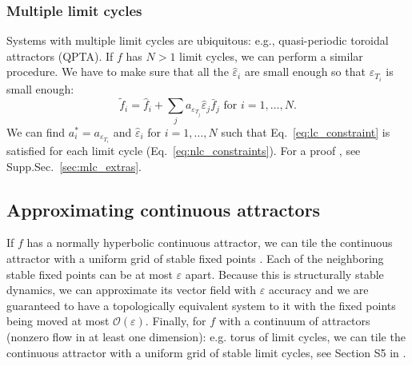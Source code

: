 \documentclass{article}
\theoremstyle{definition} \newtheorem{definition}{Definition}
\theoremstyle{remark} \newtheorem{remark}{Remark}
\newcounter{ct}
\begin{document}
\subsubsection{Multiple limit cycles}
Systems with multiple limit cycles are ubiquitous: e.g., quasi-periodic toroidal attractors (QPTA)\citep{Park2023a}.
%
If $f$ has $N>1$ limit cycles, we can perform a similar procedure.
We have to make sure that all the $\hat{\varepsilon}_i$ are small enough so that $\varepsilon_{T_i}$ is small enough:
\begin{equation}\label{eq:nlc_vfs}
\tilde f_i = \hat{f}_i + \sum_{j}a_{\varepsilon_{T_j}}\hat{\varepsilon}_j\bar{f}_j \text{ for } i=1,\dots, N.
\end{equation}
We can find $a_i^* = a_{\varepsilon_{T_i}}$ and $\hat\varepsilon_i$ for $i=1,\dots,N$ such that Eq.~\ref{eq:lc_constraint} is satisfied for each limit cycle (Eq.~\ref{eq:nlc_constraints}).
For a proof , see Supp.Sec.~\ref{sec:mlc_extras}.




\subsection{Approximating continuous attractors}\label{sec:ca_theorem}

If $f$ has a normally hyperbolic continuous attractor, we can tile the continuous attractor with a uniform grid of stable fixed points \citep{Sagodi2024a}.
Each of the neighboring stable fixed points can be at most $\varepsilon$ apart. %
Because this is structurally stable dynamics,  we can approximate its vector field with $\varepsilon$ accuracy and we are guaranteed to have a topologically equivalent system to it with the fixed points being moved at most $\mathcal{O}(\varepsilon)$. 
%
Finally, for $f$ with a continuum of attractors (nonzero flow in at least one dimension): e.g. torus of limit cycles, we can tile the continuous attractor with a uniform grid of stable limit cycles, see Section S5 in \citep{Sagodi2024a}.
\end{document}
